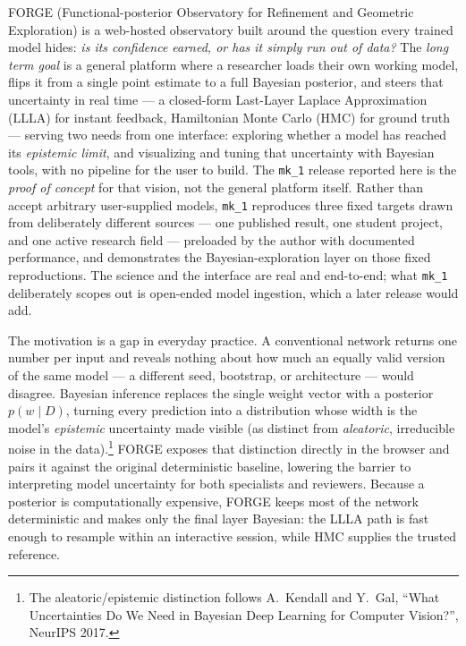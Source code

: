 \documentclass[11pt]{article}
\begin{document}
FORGE (Functional-posterior Observatory for Refinement and Geometric Exploration) is a web-hosted observatory built around the question every trained model hides: \emph{is its confidence earned, or has it simply run out of data?} The \emph{long term goal} is a general platform where a researcher loads their own working model, flips it from a single point estimate to a full Bayesian posterior, and steers that uncertainty in real time --- a closed-form Last-Layer Laplace Approximation (LLLA) for instant feedback, Hamiltonian Monte Carlo (HMC) for ground truth --- serving two needs from one interface: exploring whether a model has reached its \emph{epistemic limit}, and visualizing and tuning that uncertainty with Bayesian tools, with no pipeline for the user to build. The \mbox{\texttt{mk\_1}} release reported here is the \emph{proof of concept} for that vision, not the general platform itself. Rather than accept arbitrary user-supplied models, \mbox{\texttt{mk\_1}} reproduces three fixed targets drawn from deliberately different sources --- one published result, one student project, and one active research field --- preloaded by the author with documented performance, and demonstrates the Bayesian-exploration layer on those fixed reproductions. The science and the interface are real and end-to-end; what \mbox{\texttt{mk\_1}} deliberately scopes out is open-ended model ingestion, which a later release would add.

The motivation is a gap in everyday practice. A conventional network returns one number per input and reveals nothing about how much an equally valid version of the same model --- a different seed, bootstrap, or architecture --- would disagree. Bayesian inference replaces the single weight vector with a posterior $p(w \mid D)$, turning every prediction into a distribution whose width is the model's \emph{epistemic} uncertainty made visible (as distinct from \emph{aleatoric}, irreducible noise in the data).\footnote{The aleatoric/epistemic distinction follows A.\ Kendall and Y.\ Gal, ``What Uncertainties Do We Need in Bayesian Deep Learning for Computer Vision?'', NeurIPS 2017.} FORGE exposes that distinction directly in the browser and pairs it against the original deterministic baseline, lowering the barrier to interpreting model uncertainty for both specialists and reviewers. Because a posterior is computationally expensive, FORGE keeps most of the network deterministic and makes only the final layer Bayesian: the LLLA path is fast enough to resample within an interactive session, while HMC supplies the trusted reference.
\end{document}
